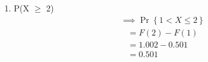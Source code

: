 \documentclass{article}
\providecommand{\cbrak}[1]{\ensuremath{\left\{#1\right\}}}
\begin{document}
\begin{enumerate}
\begin{enumerate}
        \item P(X $\geq$ 2)
        \begin{align*}
            & \implies \Pr\cbrak{1 < X \le 2} 
        \end{align*}
        \begin{align*}
            & = F(2) - F(1)\\
            & = 1.002 - 0.501\\
            & = 0.501
        \end{align*}
\end{enumerate}
\end{enumerate}
\end{document}
